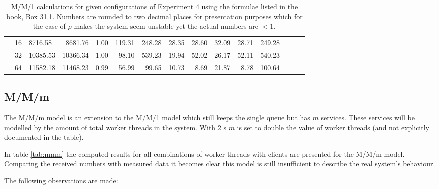 \begin{table}
{\begin{tabular}{lllrrrrrrrrrrrr}
                            & 16 & 8716.58  & 8681.76   & 1.00   & 119.31 & 248.28 & 28.35 & 28.60 & 32.09 & 28.71 & 249.28  \\
                            & 32 & 10385.53 & 10366.34  & 1.00   & 98.10  & 539.23 & 19.94 & 52.02 & 26.17 & 52.11 & 540.23  \\
                            & 64 & 11582.18 & 11468.23  & 0.99   & 56.99  & 99.65  & 10.73 & 8.69  & 21.87 & 8.78  & 100.64  \\
                    \bottomrule
                \end{tabular}
                \caption{M/M/1 calculations for given configurations of Experiment 4 using the formulae listed in
                         the book, Box 31.1. Numbers are rounded to two decimal places for presentation
                         purposes which for the case of $\rho$ makes the system seem unstable yet the actual numbers are
                         $< 1$.\label{tab:mm1}}
            }
        \end{table}

    \subsection{M/M/m\label{subsec:7_mmm}}
        The M/M/m model is an extension to the M/M/1 model which still keeps the single queue but has $m$ services. These
        services will be modelled by the amount of total worker threads in the system. With 2 \mw{}s $m$ is set to
        double the value of worker threads (and not explicitly documented in the table).

        In table \ref{tab:mmm} the computed results for all combinations of worker threads with clients are presented
        for the M/M/m model. Comparing the received numbers with measured data it becomes clear this model is still
        insufficient to describe the real system's behaviour.

        The following observations are made:

